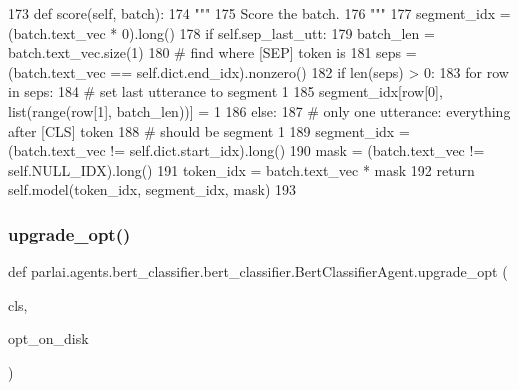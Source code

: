 \begin{DoxyCode}
173     \textcolor{keyword}{def }score(self, batch):
174         \textcolor{stringliteral}{"""}
175 \textcolor{stringliteral}{        Score the batch.}
176 \textcolor{stringliteral}{        """}
177         segment\_idx = (batch.text\_vec * 0).long()
178         \textcolor{keywordflow}{if} self.sep\_last\_utt:
179             batch\_len = batch.text\_vec.size(1)
180             \textcolor{comment}{# find where [SEP] token is}
181             seps = (batch.text\_vec == self.dict.end\_idx).nonzero()
182             \textcolor{keywordflow}{if} len(seps) > 0:
183                 \textcolor{keywordflow}{for} row \textcolor{keywordflow}{in} seps:
184                     \textcolor{comment}{# set last utterance to segment 1}
185                     segment\_idx[row[0], list(range(row[1], batch\_len))] = 1
186             \textcolor{keywordflow}{else}:
187                 \textcolor{comment}{# only one utterance: everything after [CLS] token}
188                 \textcolor{comment}{# should be segment 1}
189                 segment\_idx = (batch.text\_vec != self.dict.start\_idx).long()
190         mask = (batch.text\_vec != self.NULL\_IDX).long()
191         token\_idx = batch.text\_vec * mask
192         \textcolor{keywordflow}{return} self.model(token\_idx, segment\_idx, mask)
193 \end{DoxyCode}
\mbox{\label{classparlai_1_1agents_1_1bert__classifier_1_1bert__classifier_1_1BertClassifierAgent_a2eabac94b73fb53be7e7b05ccc788621}} 
\subsubsection{\texorpdfstring{upgrade\+\_\+opt()}{upgrade\_opt()}}
{\footnotesize\ttfamily def parlai.\+agents.\+bert\+\_\+classifier.\+bert\+\_\+classifier.\+Bert\+Classifier\+Agent.\+upgrade\+\_\+opt (\begin{DoxyParamCaption}\item[{}]{cls,  }\item[{}]{opt\+\_\+on\+\_\+disk }\end{DoxyParamCaption})}

